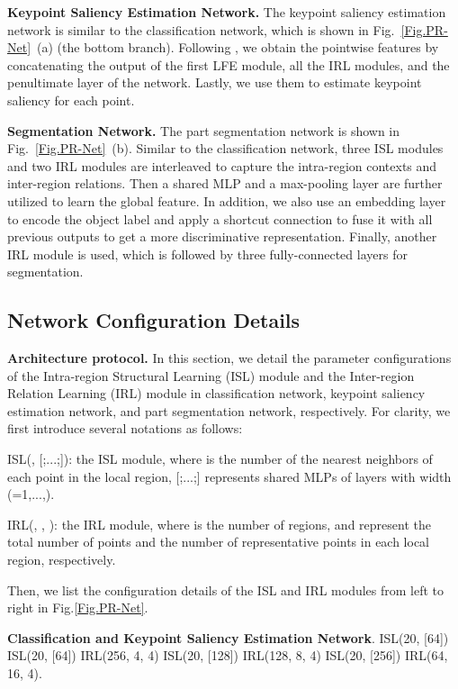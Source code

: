 \documentclass[journal]{IEEEtran}
\begin{document}
\noindent\textbf{Keypoint Saliency Estimation Network.} The keypoint saliency estimation network is similar to the classification network, which is shown in Fig.~\ref{Fig.PR-Net}~(a) (the bottom branch). Following \cite{you2020keypointnet}, we obtain the pointwise features by concatenating the output of the first LFE module, all the IRL modules, and the penultimate layer of the network. Lastly, we use them to estimate keypoint saliency for each point.

\noindent\textbf{Segmentation Network.} The part segmentation network is shown in Fig.~\ref{Fig.PR-Net}~(b). Similar to the classification network, three ISL modules and two IRL modules are interleaved to capture the intra-region contexts and inter-region relations. Then a shared MLP and a max-pooling layer are further utilized to learn the global feature. In addition, we also use an embedding layer to encode the object label and apply a shortcut connection to fuse it with all previous outputs to get a more discriminative representation. Finally, another IRL module is used, which is followed by three fully-connected layers for segmentation. 


\subsection{Network Configuration Details}\label{details}

\noindent\textbf{Architecture protocol.}
In this section, we detail the parameter configurations of the Intra-region Structural Learning (ISL) module and the Inter-region Relation Learning (IRL) module in classification network, keypoint saliency estimation network, and part segmentation network, respectively. For clarity, we first introduce several notations as follows:

ISL(, [;...;]): the ISL module, where  is the number of the nearest neighbors of each point in the local region, [;...;] represents shared MLPs of  layers with width  (=1,...,).


IRL(, , ): the IRL module, where  is the number of regions,  and  represent the total number of points and the number of representative points in each local region, respectively. 

Then, we list the configuration details of the ISL and IRL modules from left to right in Fig.\ref{Fig.PR-Net}.

\noindent\textbf{Classification and Keypoint Saliency Estimation Network}\label{classification details}. 
ISL(20, [64])  ISL(20, [64])  IRL(256, 4, 4)  ISL(20, [128])  IRL(128, 8, 4)  ISL(20, [256])  IRL(64, 16, 4).
\end{document}
